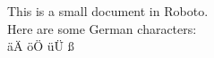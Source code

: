 \documentclass{article}
\begin{document}
This is a small document in Roboto.
\\
Here are some German characters:
\\
äÄ öÖ üÜ ß
\end{document}
